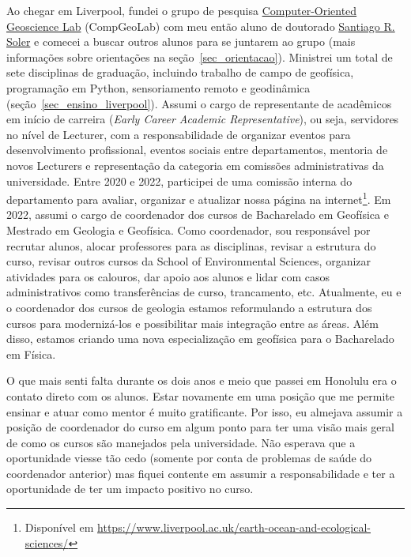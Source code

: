 \documentclass[10pt,a4paper,oneside]{book}
\begin{document}
Ao chegar em Liverpool, fundei o grupo de pesquisa
\href{https://www.compgeolab.org/}{Computer-Oriented Geoscience Lab} (CompGeoLab)
com meu então aluno de doutorado
\href{https://www.santisoler.com/}{Santiago R. Soler} e comecei a buscar outros
alunos para se juntarem ao grupo (mais informações sobre orientações na
seção~\ref{sec_orientacao}).
Ministrei um total de sete disciplinas de graduação, incluindo trabalho de
campo de geofísica, programação em Python, sensoriamento remoto e geodinâmica
(seção~\ref{sec_ensino_liverpool}).
Assumi o cargo de representante de acadêmicos em início de carreira
(\textit{Early Career Academic Representative}), ou seja, servidores no nível de
Lecturer, com a responsabilidade de organizar eventos para desenvolvimento
profissional, eventos sociais entre departamentos, mentoria de novos Lecturers
e representação da categoria em comissões administrativas da universidade.
Entre 2020 e 2022, participei de uma comissão interna do departamento para
avaliar, organizar e atualizar nossa página na internet\footnote{Disponível em
\url{https://www.liverpool.ac.uk/earth-ocean-and-ecological-sciences/}}.
Em 2022, assumi o cargo de coordenador dos cursos de Bacharelado em Geofísica
e Mestrado em Geologia e Geofísica.
Como coordenador, sou responsável por recrutar alunos, alocar professores para
as disciplinas, revisar a estrutura do curso, revisar outros cursos da School
of Environmental Sciences, organizar atividades para os calouros, dar apoio aos
alunos e lidar com casos administrativos como transferências de curso,
trancamento, etc.
Atualmente, eu e o coordenador dos cursos de geologia estamos reformulando a
estrutura dos cursos para modernizá-los e possibilitar mais integração entre as
áreas.
Além disso, estamos criando uma nova especialização em geofísica para o
Bacharelado em Física.

O que mais senti falta durante os dois anos e meio que passei em Honolulu era
o contato direto com os alunos.
Estar novamente em uma posição que me permite ensinar e atuar como mentor é
muito gratificante.
Por isso, eu almejava assumir a posição de coordenador do curso em algum ponto
para ter uma visão mais geral de como os cursos são manejados pela
universidade.
Não esperava que a oportunidade viesse tão cedo (somente por conta de problemas
de saúde do coordenador anterior) mas fiquei contente em assumir a
responsabilidade e ter a oportunidade de ter um impacto positivo no curso.
\end{document}
